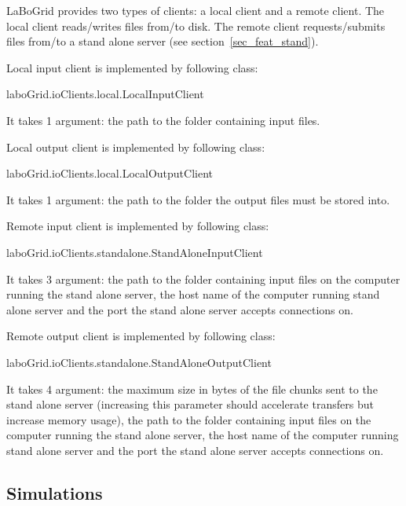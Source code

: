 LaBoGrid provides two types of clients: a local client and a remote
client. The local client reads/writes files from/to disk. The remote client
requests/submits files from/to a stand alone server (see
section~\ref{sec_feat_stand}).

Local input client is implemented by following class:
%
\begin{center}
\begin{tt}
laboGrid.ioClients.local.LocalInputClient
\end{tt}
\end{center}
%
It takes 1 argument: the path to the folder containing input files.

Local output client is implemented by following class:
%
\begin{center}
\begin{tt}
laboGrid.ioClients.local.LocalOutputClient
\end{tt}
\end{center}
%
It takes 1 argument: the path to the folder the output files must be stored
into.

Remote input client is implemented by following class:
%
\begin{center}
\begin{tt}
laboGrid.ioClients.standalone.StandAloneInputClient
\end{tt}
\end{center}
%
It takes 3 argument: the path to the folder containing input files on the
computer running the stand alone server, the host name of the computer running
stand alone server and the port the stand alone server accepts connections on.

Remote output client is implemented by following class:
%
\begin{center}
\begin{tt}
laboGrid.ioClients.standalone.StandAloneOutputClient
\end{tt}
\end{center}
%
It takes 4 argument: the maximum size in bytes of the file chunks sent to the
stand alone server (increasing this parameter should accelerate transfers but
increase memory usage), the path to the folder containing input files on the
computer running the stand alone server, the host name of the computer running
stand alone server and the port the stand alone server accepts connections on.

\subsection{Simulations}
\label{sec_conf_exp_sim}

